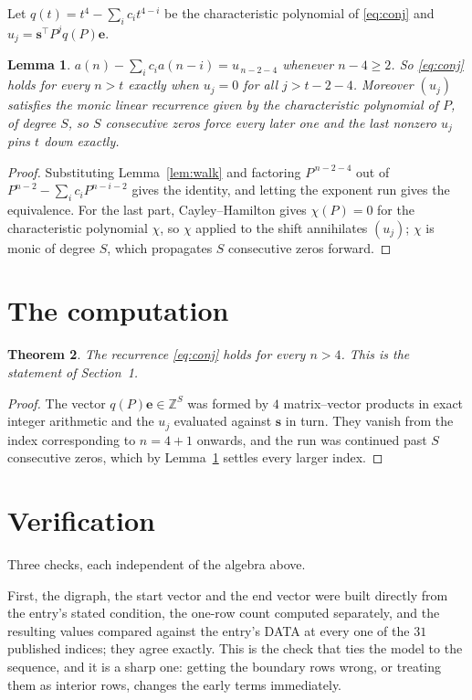 \documentclass[11pt,a4paper]{article}
\theoremstyle{plain}
\newtheorem{theorem}{Theorem}
\newtheorem{lemma}[theorem]{Lemma}
\theoremstyle{definition}
\begin{document}
Let $q(t)=t^{4}-\sum_i c_i t^{4-i}$ be the characteristic polynomial of
\eqref{eq:conj} and $u_j=\mathbf{s}^{\!\top}P^{j}q(P)\mathbf{e}$.

\begin{lemma}\label{lem:crit}
$a(n)-\sum_i c_i a(n-i)=u_{\,n-2-4}$ whenever $n-4\ge2$. So \eqref{eq:conj}
holds for every $n>t$ exactly when $u_j=0$ for all $j>t-2-4$. Moreover $(u_j)$
satisfies the monic linear recurrence given by the characteristic polynomial of $P$, of
degree $S$, so $S$ consecutive zeros force every later one and the last nonzero $u_j$ pins
$t$ down exactly.
\end{lemma}

\begin{proof}
Substituting Lemma~\ref{lem:walk} and factoring $P^{\,n-2-4}$ out of
$P^{n-2}-\sum_i c_i P^{n-i-2}$ gives the identity, and letting the exponent run gives the
equivalence. For the last part, Cayley--Hamilton gives $\chi(P)=0$ for the characteristic
polynomial $\chi$, so $\chi$ applied to the shift annihilates $(u_j)$; $\chi$ is monic of
degree $S$, which propagates $S$ consecutive zeros forward.
\end{proof}

\section{The computation}

\begin{theorem}
The recurrence \eqref{eq:conj} holds for every $n>4$. This is the statement of
Section~1.
\end{theorem}

\begin{proof}
The vector $q(P)\mathbf{e}\in\mathbb{Z}^{S}$ was formed by $4$ matrix--vector
products in exact integer arithmetic and the $u_j$ evaluated against $\mathbf{s}$ in turn.
They vanish from the index corresponding to $n=4+1$ onwards, and the run was continued
past $S$ consecutive zeros, which by Lemma~\ref{lem:crit} settles every larger index.
\end{proof}

\section{Verification}

Three checks, each independent of the algebra above.

First, the digraph, the start vector and the end vector were built directly from the
entry's stated condition, the one-row count computed separately, and the resulting values
compared against the entry's DATA at every one of the $31$ published indices; they
agree exactly. This is the check that ties the model to the sequence, and it is a sharp one:
getting the boundary rows wrong, or treating them as interior rows, changes the early terms
immediately.
\end{document}
